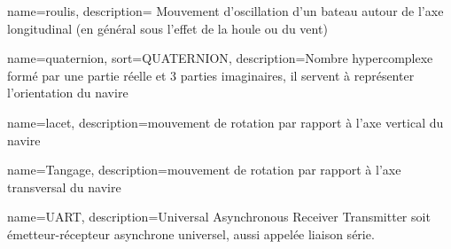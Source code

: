  {
	name=roulis,
	description={ Mouvement d'oscillation d'un bateau autour de l'axe longitudinal (en général sous l'effet de la houle ou du vent)}
}

 {
	name=quaternion,
	sort={QUATERNION},
	description={Nombre hypercomplexe formé par une partie réelle et 3 parties imaginaires, il servent à représenter l'orientation du navire}
}

 {
	name=lacet,
	description={mouvement de rotation par rapport à l'axe vertical du navire}
    }

 {
	name=Tangage,
	description={mouvement de rotation par rapport à l'axe transversal du navire}
    }

 {
	name=UART,
	description={Universal Asynchronous Receiver Transmitter soit émetteur-récepteur asynchrone universel, aussi appelée liaison série.}
}
